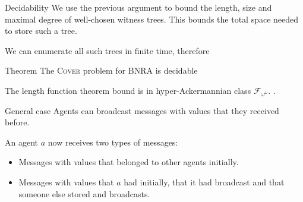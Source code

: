 \documentclass{beamer}
\newcommand{\COVER}{\textsc{Cover}\xspace}
\begin{document}



\begin{frame}{Decidability}
	We use the previous argument to bound the length, size and maximal degree of well-chosen witness trees.  
	This bounds the total space needed to store such a tree.
	\pause 

	We can enumerate all such trees in finite time, therefore
	
	\begin{block}{Theorem}
		The {\COVER} problem for  {} BNRA is decidable \onslide<3->{\color{red!70!black} and in $\mathbf{F}_{\omega^\omega}$.}
	\end{block} 
	The length function theorem bound is in hyper-Ackermannian class $\mathcal{F}_{\omega^\omega}$.
	. 
\end{frame}


\begin{frame}{General case}
	Agents can broadcast messages with values that they received before.
	\vspace{0.5cm}
	
	An agent $a$ now receives two types of messages:
	\begin{itemize}
		\item Messages with values that belonged to other agents initially.
		
		\item Messages with values that $a$ had initially, that it had broadcast and that someone else stored and broadcasts.  
	\end{itemize}
\end{frame}
\end{document}

